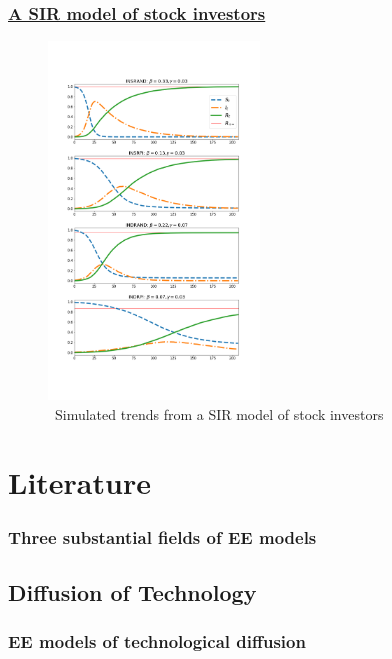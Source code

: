 \documentclass[pdflatex]{beamer}
\begin{document}
\begin{frame}
		\frametitle{\href{https://mybinder.org/v2/gh/llorracc/EpiExp/HEAD?filepath=SIR_Ndlib.ipynb}{A SIR model of stock investors} }
		\begin{figure}[!ht] \centering  %
			\caption{ ~Simulated trends from a SIR model of stock investors}
			\label{fig:sir_simulate}
			\centerline{\includegraphics[width=0.5\textwidth]{./figures/sir_simulate.png}}
		\end{figure}
\end{frame}

\section{Literature}\label{survey-of-the-literature}


\begin{frame}
	\frametitle{Three substantial fields of EE models}

\end{frame}

\subsection{Diffusion of Technology}\label{subsubsec:techDiffusion}

\begin{frame}
	\frametitle{EE models of technological diffusion}

\end{frame}
\end{document}
